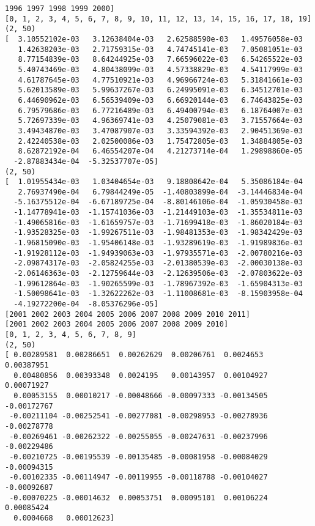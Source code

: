 \documentclass[11pt]{article}
\begin{document}
\begin{Verbatim}[commandchars=\\\{\}]
 1996 1997 1998 1999 2000]
[0, 1, 2, 3, 4, 5, 6, 7, 8, 9, 10, 11, 12, 13, 14, 15, 16, 17, 18, 19]
(2, 50)
[  3.10552102e-03   3.12638404e-03   2.62588590e-03   1.49576058e-03
   1.42638203e-03   2.71759315e-03   4.74745141e-03   7.05081051e-03
   8.77154839e-03   8.64244925e-03   7.66596022e-03   6.54265522e-03
   5.40743469e-03   4.80438099e-03   4.57338829e-03   4.54117999e-03
   4.61787645e-03   4.77510921e-03   4.96966724e-03   5.31841661e-03
   5.62013589e-03   5.99637267e-03   6.24995091e-03   6.34512701e-03
   6.44690962e-03   6.56539409e-03   6.66920144e-03   6.74643825e-03
   6.79579686e-03   6.77216489e-03   6.49400794e-03   6.18764007e-03
   5.72697339e-03   4.96369741e-03   4.25079081e-03   3.71557664e-03
   3.49434870e-03   3.47087907e-03   3.33594392e-03   2.90451369e-03
   2.42240538e-03   2.02500086e-03   1.75472805e-03   1.34884805e-03
   8.62872192e-04   6.46554207e-04   4.21273714e-04   1.29898860e-05
  -2.87883434e-04  -5.32537707e-05]
(2, 50)
[  1.01955434e-03   1.03404654e-03   9.18808642e-04   5.35086184e-04
   2.76937490e-04   6.79844249e-05  -1.40803899e-04  -3.14446834e-04
  -5.16375512e-04  -6.67189725e-04  -8.80146106e-04  -1.05930458e-03
  -1.14778941e-03  -1.15741036e-03  -1.21449103e-03  -1.35534811e-03
  -1.49065816e-03  -1.61659757e-03  -1.71699418e-03  -1.86020184e-03
  -1.93528325e-03  -1.99267511e-03  -1.98481353e-03  -1.98342429e-03
  -1.96815090e-03  -1.95406148e-03  -1.93289619e-03  -1.91989836e-03
  -1.91928112e-03  -1.94939063e-03  -1.97935571e-03  -2.00780216e-03
  -2.09874317e-03  -2.05824255e-03  -2.01380539e-03  -2.00030138e-03
  -2.06146363e-03  -2.12759644e-03  -2.12639506e-03  -2.07803622e-03
  -1.99612864e-03  -1.90265599e-03  -1.78967392e-03  -1.65904313e-03
  -1.50098641e-03  -1.32622262e-03  -1.11008681e-03  -8.15903958e-04
  -4.19272200e-04  -8.05376296e-05]
[2001 2002 2003 2004 2005 2006 2007 2008 2009 2010 2011]
[2001 2002 2003 2004 2005 2006 2007 2008 2009 2010]
[0, 1, 2, 3, 4, 5, 6, 7, 8, 9]
(2, 50)
[ 0.00289581  0.00286651  0.00262629  0.00206761  0.0024653   0.00387951
  0.00480856  0.00393348  0.0024195   0.00143957  0.00104927  0.00071927
  0.00053155  0.00010217 -0.00048666 -0.00097333 -0.00134505 -0.00172767
 -0.00211104 -0.00252541 -0.00277081 -0.00298953 -0.00278936 -0.00278778
 -0.00269461 -0.00262322 -0.00255055 -0.00247631 -0.00237996 -0.00229486
 -0.00210725 -0.00195539 -0.00135485 -0.00081958 -0.00084029 -0.00094315
 -0.00102335 -0.00114947 -0.00119955 -0.00118788 -0.00104027 -0.00092687
 -0.00070225 -0.00014632  0.00053751  0.00095101  0.00106224  0.00085424
  0.0004668   0.00012623]

\end{Verbatim}
\end{document}
